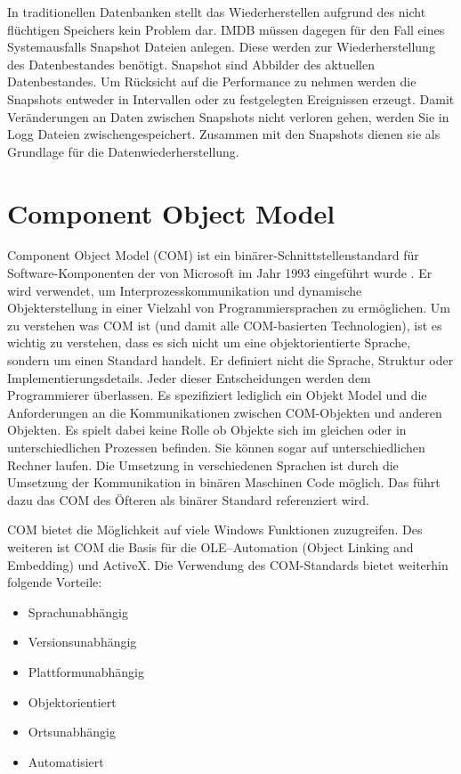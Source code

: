 In traditionellen Datenbanken stellt das Wiederherstellen aufgrund des nicht flüchtigen Speichers kein Problem dar. IMDB müssen dagegen für den Fall eines Systemausfalls Snapshot Dateien anlegen. Diese werden zur Wiederherstellung des Datenbestandes benötigt. Snapshot sind Abbilder des aktuellen Datenbestandes. Um Rücksicht auf die Performance zu nehmen werden die Snapshots entweder in Intervallen oder zu festgelegten Ereignissen erzeugt. Damit Veränderungen an Daten zwischen Snapshots nicht verloren gehen, werden Sie in Logg Dateien zwischengespeichert. Zusammen mit den Snapshots dienen sie als Grundlage für die Datenwiederherstellung. 

\section{Component Object Model}
\label{ch:grundlagen:sec:ComponentObjectModel}

Component Object Model (COM) ist ein binärer-Schnittstellenstandard für Software-Komponenten der von Microsoft im Jahr 1993 eingeführt wurde \cite{SWB-088582566}. Er wird verwendet, um Interprozesskommunikation und dynamische Objekterstellung in einer Vielzahl von Programmiersprachen zu ermöglichen. Um zu verstehen was COM ist (und damit alle COM-basierten Technologien), ist es wichtig zu verstehen, dass es sich nicht um eine objektorientierte Sprache, sondern um einen Standard handelt. Er definiert nicht die Sprache, Struktur oder Implementierungsdetails. Jeder dieser Entscheidungen werden dem Programmierer überlassen. Es spezifiziert lediglich ein Objekt Model und die Anforderungen an die Kommunikationen zwischen COM-Objekten und anderen Objekten. Es spielt dabei keine Rolle ob Objekte sich im gleichen oder in unterschiedlichen Prozessen befinden. Sie können sogar auf unterschiedlichen Rechner laufen. Die Umsetzung in verschiedenen Sprachen ist durch die Umsetzung der Kommunikation in binären Maschinen Code möglich. Das führt dazu das COM des Öfteren als binärer Standard referenziert wird.

COM bietet die Möglichkeit auf viele Windows Funktionen zuzugreifen. Des weiteren ist COM die Basis für die OLE–Automation (Object Linking and Embedding) und ActiveX. Die Verwendung des COM-Standards bietet weiterhin folgende Vorteile:

\begin{itemize}
\item Sprachunabhängig
\item Versionsunabhängig
\item Plattformunabhängig
\item Objektorientiert
\item Ortsunabhängig
\item Automatisiert
\end{itemize} 

